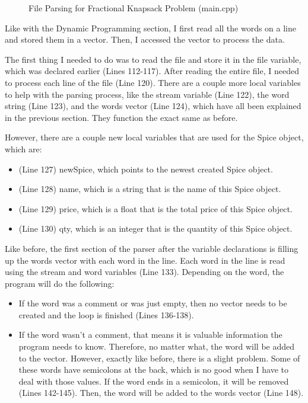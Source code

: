 \documentclass[letterpaper, 10pt]{article}
\begin{document}
\begin{figure}[H]
  \centering
 
  \label{fig:figure3.2-part1}
\end{figure}

\begin{figure}[H]
  \centering
   
  \caption{File Parsing for Fractional Knapsack Problem (main.cpp)}
  \label{fig:figure3.2-part2}
\end{figure}

\noindent
Like with the Dynamic Programming section, I first read all the words on a line and stored them in a vector. Then, I accessed the vector to process the data.

\vspace{1em}
\noindent
The first thing I needed to do was to read the file and store it in the file variable, which was declared earlier (Lines 112-117). After reading the entire file, I needed to process each line of the file (Line 120). There are a couple more local variables to help with the parsing process, like the stream variable (Line 122), the word string (Line 123), and the words vector (Line 124), which have all been explained in the previous section. They function the exact same as before.

\vspace{1em}
\noindent
However, there are a couple new local variables that are used for the Spice object, which are:
\begin{itemize}
    \item (Line 127) newSpice, which points to the newest created Spice object.
    \item (Line 128) name, which is a string that is the name of this Spice object.
    \item (Line 129) price, which is a float that is the total price of this Spice object.
    \item (Line 130) qty, which is an integer that is the quantity of this Spice object.
\end{itemize}

\noindent
Like before, the first section of the parser after the variable declarations is filling up the words vector with each word in the line. Each word in the line is read using the stream and word variables (Line 133). Depending on the word, the program will do the following:
\begin{itemize}
    \item If the word was a comment or was just empty, then no vector needs to be created and the loop is finished (Lines 136-138).
    \item If the word wasn't a comment, that means it is valuable information the program needs to know. Therefore, no matter what, the word will be added to the vector. However, exactly like before, there is a slight problem. Some of these words have semicolons at the back, which is no good when I have to deal with those values. If the word ends in a semicolon, it will be removed (Lines 142-145). Then, the word will be added to the words vector (Line 148).
\end{itemize}
\end{document}
